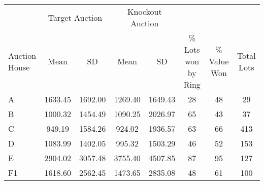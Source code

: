 \begin{tabular}{lccccccc}
\toprule
& \multicolumn{2}{c}{Target Auction} & \multicolumn{2}{c}{Knockout Auction} & & & \\
\cmidrule(lr){2-3}\cmidrule(lr){4-5}
Auction House & Mean & SD & Mean & SD & \% Lots won by Ring & \% Value Won & Total Lots \\ \midrule
A & 1633.45 & 1692.00 & 1269.40 & 1649.43 & 28 & 48 & 29 \\
B & 1000.32 & 1454.49 & 1090.25 & 2026.97 & 65 & 43 & 37 \\
C & 949.19 & 1584.26 & 924.02 & 1936.57 & 63 & 66 & 413 \\
D & 1083.99 & 1402.05 & 995.32 & 1503.29 & 46 & 52 & 153 \\
E & 2904.02 & 3057.48 & 3755.40 & 4507.85 & 87 & 95 & 127 \\
F1 & 1618.60 & 2562.45 & 1473.65 & 2835.08 & 48 & 61 & 100 \\
\bottomrule
\end{tabular}
